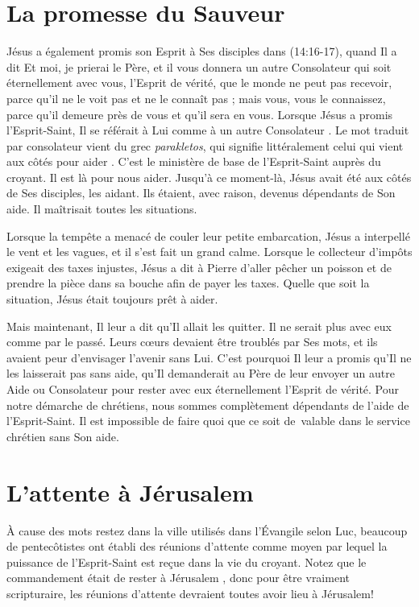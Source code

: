 \section{La promesse du Sauveur}

Jésus a également promis son Esprit à Ses disciples dans
 \BRallowhypbch{}(14:16-17)\BRforbidhypbch, quand Il a dit\frcolon{}
 \Og Et moi, je prierai le Père, et il vous donnera un autre Consolateur
 qui soit éternellement avec vous, l'Esprit de vérité, que le monde ne peut
 pas recevoir, parce qu'il ne le voit pas et ne le connaît pas ; mais vous,
 vous le connaissez, parce qu'il demeure près de vous
 et qu'il sera en vous. \Fg{}
 Lorsque Jésus a promis l'Esprit-Saint, Il se référait à Lui comme à
 \Og un autre Consolateur \Fg{}.
 Le mot traduit par \Og consolateur \Fg{} vient du grec \emph{parakletos},
 qui signifie littéralement \Og celui qui vient aux côtés pour aider \Fg{}.
 C'est le ministère de base de l'Esprit-Saint auprès du croyant.
 Il est là pour nous aider. Jusqu'à ce moment-là, Jésus avait été aux côtés
 de Ses disciples, les aidant. Ils étaient, avec raison, devenus dépendants
 de Son aide. Il maîtrisait toutes les situations.

Lorsque la tempête a menacé de couler leur petite embarcation, Jésus
 a interpellé le vent et les vagues, et il s'est fait un grand calme.
 Lorsque le collecteur d'impôts exigeait des taxes injustes,
 Jésus a dit à Pierre d'aller pêcher un poisson et de prendre
 la pièce dans sa bouche afin de payer les taxes.
 Quelle que soit la situation, Jésus était toujours prêt à aider.

Mais maintenant, Il leur a dit qu'Il allait les quitter.
 Il ne serait plus avec eux comme par le passé.
 Leurs cœurs devaient être troublés par Ses mots,
 et ils avaient peur d'envisager l'avenir sans Lui.
 C'est pourquoi Il leur a promis qu'Il ne les laisserait pas sans aide,
 qu'Il demanderait au Père de leur envoyer un autre Aide ou Consolateur
 pour rester avec eux éternellement\frcolon{}
 l'Esprit de vérité.
 Pour notre démarche de chrétiens, nous sommes complètement dépendants de
 l'aide de l'Esprit-Saint.
 Il est impossible de faire quoi que ce soit de~valable dans le service
 chrétien sans Son aide.

\section{L'attente \`a J\'erusalem}

À cause des mots \Og restez dans la ville \Fg{} utilisés dans
 l'Évangile
 selon Luc, beaucoup de pentecôtistes ont établi des \Og réunions
 d'attente \Fg{} comme moyen par lequel la puissance de l'Esprit-Saint est
 reçue dans la vie du croyant. Notez que le commandement était de \Og rester
 à Jérusalem \Fg{},
 donc pour être vraiment scripturaire, les réunions d'attente devraient toutes
 avoir lieu à Jérusalem!


